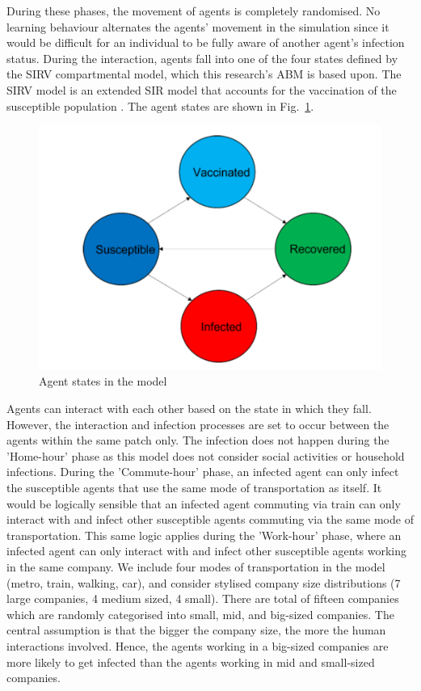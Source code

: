 \documentclass[smallextended]{svjour3}       %
\begin{document}
During these phases, the movement of agents is completely randomised. No learning behaviour alternates the agents' movement in the simulation since it would be difficult for an individual to be fully aware of another agent’s infection status. During the interaction, agents fall into one of the four states defined by the SIRV compartmental model, which this research’s ABM is based upon. The SIRV model is an extended SIR model that accounts for the vaccination of the susceptible population \cite{poonia2022enhanced}. The agent states are shown in Fig.~\ref{fig:agentstates}.

\begin{figure}
	\centering
	\includegraphics[width=0.5\linewidth]{figures/AgentStates.png}	
	\caption{Agent states in the model\label{fig:agentstates}}
\end{figure}

Agents can interact with each other based on the state in which they fall. However, the interaction and infection processes are set to occur between the agents within the same patch only. The infection does not happen during the 'Home-hour' phase as this model does not consider social activities or household infections. During the 'Commute-hour' phase, an infected agent can only infect the susceptible agents that use the same mode of transportation as itself. It would be logically sensible that an infected agent commuting via train can only interact with and infect other susceptible agents commuting via the same mode of transportation. This same logic applies during the 'Work-hour' phase, where an infected agent can only interact with and infect other susceptible agents working in the same company. We include four modes of transportation in the model (metro, train, walking, car), and consider stylised company size distributions (7 large companies, 4 medium sized, 4 small). There are total of fifteen companies which are randomly categorised into small, mid, and big-sized companies. The central assumption is that the bigger the company size, the more the human interactions involved. Hence, the agents working in a big-sized companies are more likely to get infected than the agents working in mid and small-sized companies.
\end{document}
